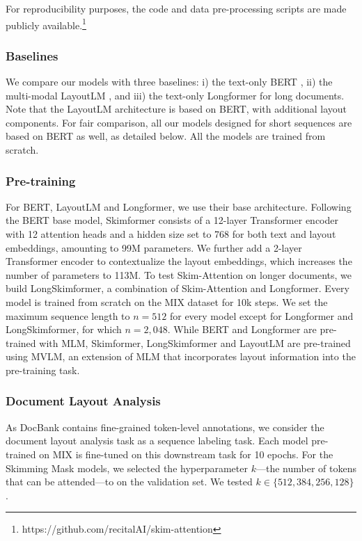 For reproducibility purposes, the code and data pre-processing scripts are made publicly available.\footnote{https://github.com/recitalAI/skim-attention}

\subsubsection{Baselines}

We compare our models with three baselines: i) the text-only \ac{BERT} \citep{devlin2018bert}, ii) the multi-modal LayoutLM \citep{xu2020layoutlm}, and iii) the text-only Longformer \citep{beltagy2020longformer} for long documents. Note that the LayoutLM architecture is based on \ac{BERT}, with additional layout components. For fair comparison, all our models designed for short sequences are based on \ac{BERT} as well, as detailed below. All the models are trained from scratch.

\subsubsection{Pre-training}

For \ac{BERT}, LayoutLM and Longformer, we use their base architecture. Following the \ac{BERT} base model, Skimformer consists of a 12-layer Transformer encoder with 12 attention heads and a hidden size set to 768 for both text and layout embeddings, amounting to 99M parameters. We further add a 2-layer Transformer encoder to contextualize the layout embeddings, which increases the number of parameters to 113M. To test Skim-Attention on longer documents, we build LongSkimformer, a combination of Skim-Attention and Longformer. Every model is trained from scratch on the MIX dataset for 10k steps. We set the maximum sequence length to $n = 512$ for every model except for Longformer and LongSkimformer, for which $n = 2,048$. While \ac{BERT} and Longformer are pre-trained with \ac{MLM}, Skimformer, LongSkimformer and LayoutLM are pre-trained using \ac{MVLM}, an extension of \ac{MLM} that incorporates layout information into the pre-training task. 

\subsubsection{Document Layout Analysis}

As DocBank contains fine-grained token-level annotations, we consider the document layout analysis task as a sequence labeling task. Each model pre-trained on MIX is fine-tuned on this downstream task for 10 epochs. For the Skimming Mask models, we selected the hyperparameter $k$—the number of tokens that can be attended—to on the validation set. We tested $k \in \{512, 384, 256, 128\}$.

